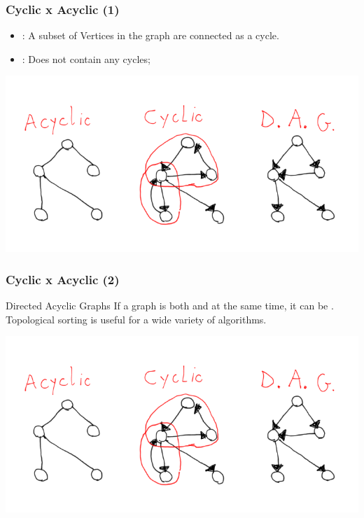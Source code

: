 \documentclass{beamer}
\begin{document}
\begin{frame}
  \frametitle{Cyclic x Acyclic (1)}
  \begin{itemize}
    \item {}: A subset of Vertices in the graph are
      connected as a cycle.
    \item {}: Does not contain any cycles;
  \end{itemize}
  \begin{center}
    \includegraphics[height=0.6\textheight]{img/cyclic}
  \end{center}
\end{frame}

\begin{frame}
  \frametitle{Cyclic x Acyclic (2)}
  \begin{block}{Directed Acyclic Graphs}
    If a graph is both  and  at
    the same time, it can be . Topological sorting is useful for a wide variety
    of algorithms.
  \end{block}
  \begin{center}
    \includegraphics[height=0.6\textheight]{img/cyclic}
  \end{center}
\end{frame}
\end{document}
